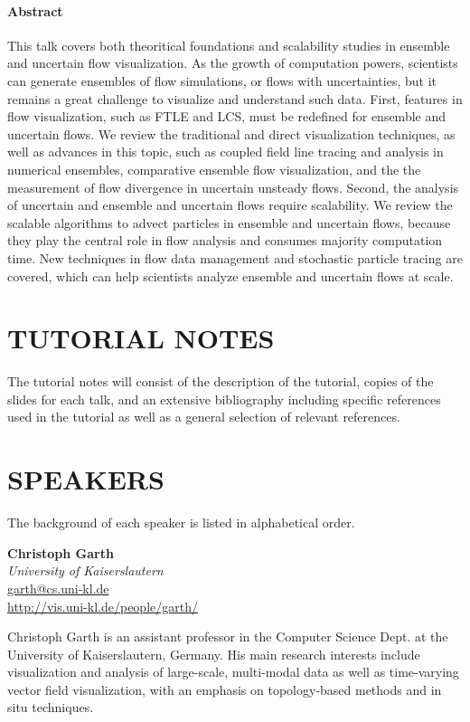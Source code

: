\documentclass[preprint,journal]{vgtc}       %
\newcommand{\addverticalspace}{\vspace{3mm}}
\begin{document}
\paragraph{Abstract}
This talk covers both theoritical foundations and scalability studies in 
ensemble and uncertain flow visualization. 
As the growth of computation powers, scientists can generate ensembles of flow simulations, or flows with uncertainties, but it remains a great challenge to visualize and understand such data. 
First, features in flow visualization, such as FTLE and LCS, must be redefined for ensemble and uncertain flows.  
We review the traditional and direct visualization techniques, as well as advances in this topic, such as coupled field line tracing and analysis in numerical ensembles, comparative ensemble flow visualization, and the the measurement of flow divergence in uncertain unsteady flows. 
Second, the analysis of uncertain and ensemble and uncertain flows require scalability. 
We review the scalable algorithms to advect particles in ensemble and uncertain flows, 
because they play the central role in flow analysis and consumes majority computation time. 
New techniques in flow data management and stochastic particle tracing are covered, which can help scientists analyze ensemble and uncertain flows at scale. 


\section*{TUTORIAL NOTES}
The tutorial notes will consist of the description of the tutorial, copies of the slides for each talk, and an extensive bibliography including specific references used in the tutorial as well as a general selection of relevant references.

\section*{SPEAKERS}
The background of each speaker is listed in alphabetical order.

\addverticalspace

\noindent \textbf{Christoph Garth}\\
\emph{University of Kaiserslautern}\\
\href{mailto:garth@cs.uni-kl.de}{garth@cs.uni-kl.de}\\
\url{http://vis.uni-kl.de/people/garth/}

\addverticalspace

Christoph Garth is an assistant professor in the Computer Science Dept. at the University of Kaiserslautern, Germany. His main research interests include visualization and analysis of large-scale, multi-modal data as well as time-varying vector field visualization, with an emphasis on topology-based methods and in situ techniques.
\end{document}

